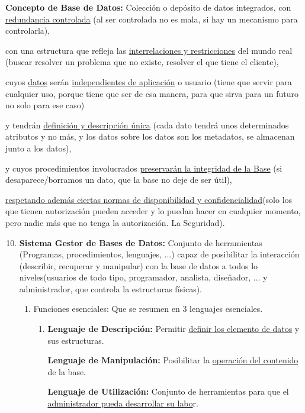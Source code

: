 \documentclass[12pt, twoside, openright]{report} %
\begin{document}
  \textbf{Concepto de Base de Datos:} Colección o depósito de datos
  integrados, con \underline{redundancia controlada} (al ser controlada no es mala, si
hay un mecanismo para controlarla),

con una estructura que refleja las \underline{interrelaciones y
restricciones} del mundo real (buscar resolver un problema que no
existe, resolver el que tiene el cliente),

cuyos \underline{datos} serán \underline{independientes de aplicación} o
usuario (tiene que servir para cualquier uso, porque tiene que ser de
esa manera, para que sirva para un futuro no solo para ese caso)

y tendrán \underline{definición y descripción única} (cada dato tendrá
unos determinados atributos y no más, y los datos sobre los datos son
los metadatos, se almacenan junto a los datos),

y cuyos procedimientos involucrados \underline{preservarán la integridad
de la Base} (si desaparece/borramos un dato, que la base no deje de ser
útil),

\underline{respetando además ciertas normas de disponibilidad y
confidencialidad}(solo los que tienen autorización pueden acceder y lo
puedan hacer en cualquier momento, pero nadie más que no tenga la
autorización. La Seguridad).

\begin{enumerate}
\setcounter{enumi}{9}
\item \textbf{Sistema Gestor de Bases de Datos:} Conjunto de herramientas
  (Programas, procedimientos, lenguajes, ...) capaz de posibilitar la
  interacción (describir, recuperar y manipular) con la base de datos a
  todos lo niveles(usuarios de todo tipo, programador, analista,
  diseñador, ... y administrador, que controla la estructuras físicas).

  \begin{enumerate}
  \item Funciones esenciales: Que se resumen en 3 lenguajes esenciales.
    

    \begin{enumerate}
    \item \textbf{Lenguaje de Descripción:} Permitir \underline{definir los
      elemento de datos} y sus estructuras.
      

      
      \textbf{Lenguaje de Manipulación:} Posibilitar la
      \underline{operación del contenido} de la base.
      

      
      \textbf{Lenguaje de Utilización:} Conjunto de herramientas para
      que el \underline{administrador pueda desarrollar su labo}r.
      
    \end{enumerate}
  \end{enumerate}
\end{enumerate}
\end{document}
